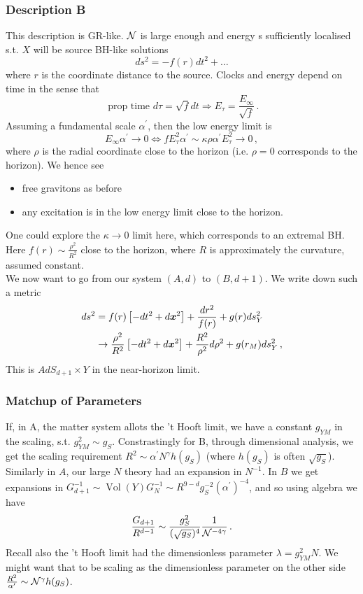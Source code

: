 \documentclass{article}
\begin{document}
\subsubsection{Description B}
This description is GR-like. $\mathcal{N}$ is large enough and energy s sufficiently localised s.t. $X$ will be source BH-like solutions
\[
ds^2 = -f(r) dt^2 + \dots
\]
where $r$ is the coordinate distance to the source. Clocks and energy depend on time in the sense that 
\[
\text{ prop time } d\tau = \sqrt{f} dt \Rightarrow E_\tau = \frac{E_\infty}{\sqrt{f}} \, .
\]
Assuming a fundamental scale $\alpha^\prime$, then the low energy limit is 
\[
E_\infty \alpha^\prime \to 0 \Leftrightarrow f E_\tau^2 \alpha^\prime \sim \kappa \rho \alpha^\prime E_\tau^2 \to 0 \, , 
\]
where $\rho$ is the radial coordinate close to the horizon (i.e. $\rho=0$ corresponds to the horizon). We hence see 
\begin{itemize}
	\item free gravitons as before 
	\item any excitation is in the low energy limit close to the horizon. 
\end{itemize}
One could explore the $\kappa \to 0$ limit here, which corresponds to an extremal BH. Here $f(r) \sim \frac{\rho^2}{R^2}$ close to the horizon, where $R$ is approximately the curvature, assumed constant. \\
We now want to go from our system $(A, d)$ to $(B, d+1)$. We write down such a metric 
\begin{align*}
ds^2 &= f(r) \left[ -dt^2 + d \bm{x}^2 \right] + \frac{dr^2}{f(r)} + g(r) ds_Y^2 \, \\ 
&\to \frac{\rho^2}{R^2} \left[ -dt^2 + d\bm{x}^2 \right] + \frac{R^2}{\rho^2} d\rho^2 + g(r_M) ds_Y^2 \, ,
\end{align*}
This is $AdS_{d+1}\times Y$ in the near-horizon limit. 

\subsubsection{Matchup of Parameters}
If, in A, the matter system allots the 't Hooft limit, we have a constant $g_{YM}$ in the scaling, s.t. $g_{YM}^2 \sim g_S$. Constrastingly for B, through dimensional analysis, we get the scaling requirement $R^2 \sim \alpha^\prime N^\gamma h(g_S)$ (where $h(g_S)$ is often $\sqrt{g_S}$). Similarly in $A$, our large $N$ theory had an expansion in $N^{-1}$.  In $B$ we get expansions in $G_{d+1}^{-1} \sim \operatorname{Vol}(Y) G_N^{-1} \sim R^{9-d}g_S^{-2} (\alpha^\prime)^{-4}$, and so using algebra we have 
\[
\frac{G_{d+1}}{R^{d-1}} \sim \frac{g_S^2}{(\sqrt{g_S})^4} \frac{1}{\mathcal{N}^{-4\gamma}} \, .
\]
Recall also the 't Hooft limit had the dimensionless parameter $\lambda = g_{YM}^2 N$. We might want that to be scaling as the dimensionless parameter on the other side $\frac{R^2}{\alpha^\prime} \sim \mathcal{N}^\gamma h(g_S)$.
\end{document}
